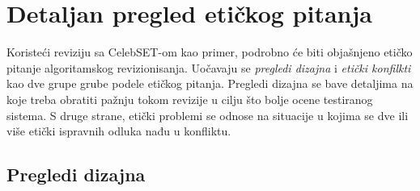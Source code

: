 \documentclass[11pt, a4paper]{article}
\begin{document}
\section{Detaljan pregled etičkog pitanja}
Koristeći reviziju sa CelebSET-om kao primer, podrobno će biti objašnjeno etičko pitanje algoritamskog revizionisanja. Uočavaju se \textit{pregledi dizajna} i \textit{etički konfilkti} kao dve grupe grube podele etičkog pitanja. Pregledi dizajna se bave detaljima na koje treba obratiti pažnju tokom revizije u cilju što bolje ocene testiranog sistema. S druge strane, etički problemi se odnose na situacije u kojima se dve ili više etički ispravnih odluka nađu u konfliktu.

\subsection{Pregledi dizajna}
\end{document}
